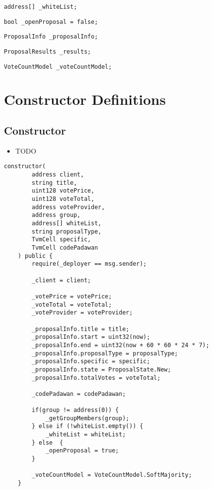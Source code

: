 \begin{lstlisting}[firstnumber=24]
    address[] _whiteList;
\end{lstlisting}

\begin{lstlisting}[firstnumber=25]
    bool _openProposal = false;
\end{lstlisting}

\begin{lstlisting}[firstnumber=27]
    ProposalInfo _proposalInfo;
\end{lstlisting}

\begin{lstlisting}[firstnumber=29]
    ProposalResults _results;
\end{lstlisting}

\begin{lstlisting}[firstnumber=30]
    VoteCountModel _voteCountModel;
\end{lstlisting}

\section{Constructor Definitions}


\subsection{Constructor}

\begin{itemize}
\item TODO
\end{itemize}

\begin{lstlisting}[firstnumber=32]
    constructor(
        address client,
        string title,
        uint128 votePrice,
        uint128 voteTotal,
        address voteProvider,
        address group,
        address[] whiteList,
        string proposalType,
        TvmCell specific,
        TvmCell codePadawan
    ) public {
        require(_deployer == msg.sender);

        _client = client;

        _votePrice = votePrice;
        _voteTotal = voteTotal;
        _voteProvider = voteProvider;

        _proposalInfo.title = title;
        _proposalInfo.start = uint32(now);
        _proposalInfo.end = uint32(now + 60 * 60 * 24 * 7);
        _proposalInfo.proposalType = proposalType;
        _proposalInfo.specific = specific;
        _proposalInfo.state = ProposalState.New;
        _proposalInfo.totalVotes = voteTotal;

        _codePadawan = codePadawan;

        if(group != address(0)) {
            _getGroupMembers(group);
        } else if (!whiteList.empty()) {
            _whiteList = whiteList;
        } else  {
            _openProposal = true;
        }

        _voteCountModel = VoteCountModel.SoftMajority;
    }
\end{lstlisting}

